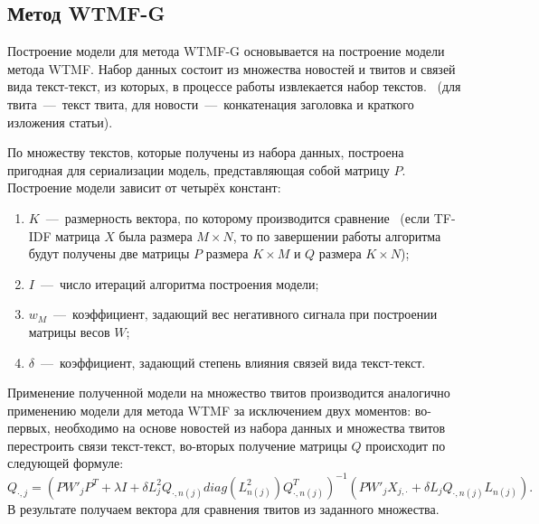 \subsection{Метод WTMF-G}
    Построение модели для метода WTMF-G основывается на построение модели метода WTMF.
    Набор данных состоит из множества новостей и твитов и связей вида текст-текст, из которых, в процессе работы извлекается набор текстов.
    ~(для твита~---~текст твита, для новости~---~конкатенация заголовка и краткого изложения статьи).

    По множеству текстов, которые получены из набора данных, построена пригодная для сериализации модель, представляющая собой матрицу $P$.
    Построение модели зависит от четырёх констант:
    \begin{enumerate}
        \item $K$~---~размерность вектора, по которому производится сравнение~
        (если TF-IDF матрица $X$ была размера $M \times N$, то по завершении работы алгоритма будут получены две матрицы $P$ размера $K \times M$ и $Q$ размера $K \times N$);
        \item $I$~---~число итераций алгоритма построения модели;
        \item $w_M$~---~коэффициент, задающий вес негативного сигнала при построении матрицы весов $W$;
        \item $\delta$~---~коэффициент, задающий степень влияния связей вида текст-текст.
    \end{enumerate}

    Применение полученной модели на множество твитов производится аналогично применению модели для метода WTMF за исключением двух моментов:
    во-первых, необходимо на основе новостей из набора данных и множества твитов перестроить связи текст-текст, во-вторых получение матрицы $Q$ происходит по следующей формуле:
    $$Q_{\cdot, j} = (P W'_j P^T + \lambda I + \delta  L_j^2 Q_{\cdot,n(j)} diag(L^2_{n(j)})Q_{\cdot,n(j)}^T)^{-1}   (P W'_j X_{j,\cdot} + \delta  L_j Q_{\cdot,n(j)} L_{n(j)}).$$
    В результате получаем вектора для сравнения твитов из заданного множества.
